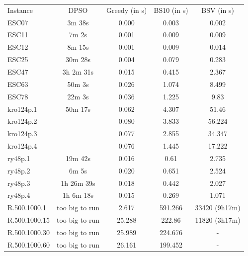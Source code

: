 \documentclass[]{article}
\begin{document}
	\begin{table}[htb]
		\begin{tabular}{lcccc}
			Instance      & DPSO           & Greedy (in s) & BS10 (in s) & BSV (in s)    \\
			ESC07         &     3m 38s     & 0.000         & 0.003       & 0.002         \\
			ESC11         &     7m  2s     & 0.001         & 0.009       & 0.009         \\
			ESC12         &     8m 15s     & 0.001         & 0.009       & 0.014         \\
			ESC25         &    30m 28s     & 0.004         & 0.079       & 0.283         \\
			ESC47         & 3h  2m 31s     & 0.015         & 0.415       & 2.367         \\
			ESC63         &    50m  3s     & 0.026         & 1.074       & 8.499         \\
			ESC78         &    22m  3s     & 0.036         & 1.225       & 9.83          \\
			kro124p.1     &    50m 17s     & 0.062         & 4.307       & 51.46         \\
			kro124p.2     &                & 0.080         & 3.833       & 56.224        \\
			kro124p.3     &                & 0.077         & 2.855       & 34.347        \\
			kro124p.4     &                & 0.076         & 1.445       & 17.222        \\
			ry48p.1       &    19m 42s     & 0.016         & 0.61        & 2.735         \\
			ry48p.2       &     6m  5s     & 0.020         & 0.651       & 2.524         \\
			ry48p.3       & 1h 26m 39s     & 0.018         & 0.442       & 2.027         \\
			ry48p.4       & 1h  6m 18s     & 0.015         & 0.269       & 1.071         \\
			R.500.1000.1  & too big to run & 2.617         & 591.266     & 33420 (9h17m) \\
			R.500.1000.15 & too big to run & 25.288        & 222.86      & 11820 (3h17m) \\
			R.500.1000.30 & too big to run & 25.989        & 224.676     & -             \\
			R.500.1000.60 & too big to run & 26.161        & 199.452     & -             \\

\end{tabular}
\end{table}
\end{document}
